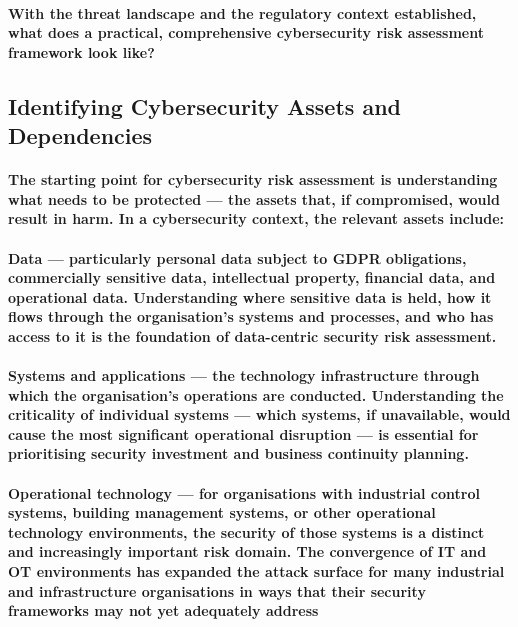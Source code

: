 \paragraph{With the threat landscape and the regulatory context established, what does a practical, comprehensive cybersecurity risk assessment framework look like?}

\subsection{Identifying Cybersecurity Assets and Dependencies}
\paragraph{The starting point for cybersecurity risk assessment is understanding what needs to be protected — the assets that, if compromised, would result in harm. In a cybersecurity context, the relevant assets include:}
\paragraph{\textbf{Data} — particularly personal data subject to GDPR obligations, commercially sensitive data, intellectual property, financial data, and operational data. Understanding where sensitive data is held, how it flows through the organisation's systems and processes, and who has access to it is the foundation of data-centric security risk assessment.}
\paragraph{\textbf{Systems and applications} — the technology infrastructure through which the organisation's operations are conducted. Understanding the criticality of individual systems — which systems, if unavailable, would cause the most significant operational disruption — is essential for prioritising security investment and business continuity planning.}
\paragraph{\textbf{Operational technology} — for organisations with industrial control systems, building management systems, or other operational technology environments, the security of those systems is a distinct and increasingly important risk domain. The convergence of IT and OT environments has expanded the attack surface for many industrial and infrastructure organisations in ways that their security frameworks may not yet adequately address}
